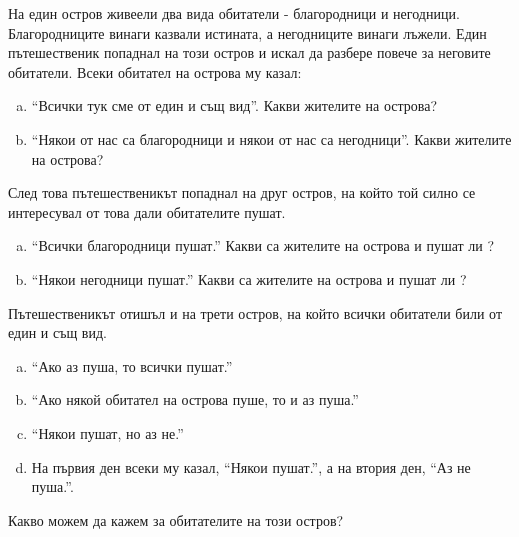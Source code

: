 \begin{problem}
  На един остров живеели два вида обитатели - благородници и негодници.
  Благородниците винаги казвали истината, а негодниците винаги лъжели.
  Един пътешественик попаднал на този остров и искал да разбере повече за
  неговите обитатели.
  Всеки обитател на острова му казал:
  \begin{enumerate}[a)]
  \item
    ``Всички тук сме от един и същ вид''.
    Какви жителите на острова?
  \item
    ``Някои от  нас са благородници и някои от нас са негодници''.
    Какви жителите на острова?
  \end{enumerate}
\end{problem}

\begin{problem}
  След това пътешественикът попаднал на друг остров, на който
  той силно се интересувал от това дали обитателите пушат.
  \begin{enumerate}[a)]
  \item
    ``Всички благородници пушат.''
    Какви са жителите на острова и пушат ли ?
  \item
    ``Някои негодници пушат.''
    Какви са жителите на острова и пушат ли ?
  \end{enumerate}
\end{problem}

\begin{problem}
  Пътешественикът отишъл и на трети остров, на който всички обитатели били от един и същ вид.
  \begin{enumerate}[a)]
  \item
    ``Ако аз пуша, то всички пушат.''
  \item
    ``Ако някой обитател на острова пуше, то и аз пуша.''
  \item
    ``Някои пушат, но аз не.''
  \item
    На първия ден всеки му казал, ``Някои пушат.'', 
    а на втория ден, ``Аз не пуша.''.
  \end{enumerate}
  Какво можем да кажем за обитателите на този остров?
\end{problem}



